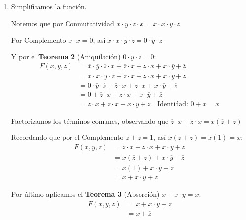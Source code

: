 \documentclass[12pt,letterpaper]{article}
\begin{document}
\begin{enumerate}[label=\arabic*.]
  \begin{enumerate}[label=\arabic*)]
  \item Simplificamos la funci\'{o}n.

    Notemos que por Conmutatividad $\overline{x} \cdot \overline{y} \cdot \overline{z} \cdot x = \overline{x} \cdot x \cdot \overline{y} \cdot \overline{z}$
    
    Por Complemento $\overline{x} \cdot x = 0$, as\'{i} $\overline{x} \cdot x \cdot \overline{y} \cdot \overline{z} = 0 \cdot \overline{y} \cdot \overline{z}$
    
    Y por el \textbf{Teorema 2} (Aniquilaci\'{o}n) $0 \cdot \overline{y} \cdot \overline{z} = 0$:
    \begin{align*}
      F(x, y, z) &= \overline{x} \cdot \overline{y} \cdot \overline{z} \cdot x + \overline{z} \cdot x + z \cdot x + x \cdot \overline{y} + \overline{z}\\
      &= \overline{x} \cdot x \cdot \overline{y} \cdot \overline{z} + \overline{z} \cdot x + z \cdot x + x \cdot \overline{y} + \overline{z}\\
      &= 0 \cdot \overline{y} \cdot \overline{z} + \overline{z} \cdot x + z \cdot x + x \cdot \overline{y} + \overline{z}\\
      &= 0 + \overline{z} \cdot x + z \cdot x + x \cdot \overline{y} + \overline{z}\\
      &= \overline{z} \cdot x + z \cdot x + x \cdot \overline{y} + \overline{z} \quad \text{Identidad: } 0 + x = x
    \end{align*}

    Factorizamos los términos comunes, observando que $\overline{z} \cdot x + z \cdot x = x(\overline{z} + z)$

    Recordando que por el Complemento $\overline{z} + z = 1$, as\'{i} $x(\overline{z} + z) = x(1) = x$:
    \begin{align*}
      F(x, y, z) &= \overline{z} \cdot x + z \cdot x + x \cdot \overline{y} + \overline{z}\\
      &= x(\overline{z} + z) + x \cdot \overline{y} + \overline{z}\\
      &= x(1) + x \cdot \overline{y} + \overline{z}\\
      &= x + x \cdot \overline{y} + \overline{z}
    \end{align*}

    Por \'{u}ltimo aplicamos el \textbf{Teorema 3} (Absorci\'{o}n) $x + x \cdot y = x$:
    \begin{align*}
      F(x, y, z) &=  x + x \cdot \overline{y} + \overline{z}\\
      &= x + \overline{z}
    \end{align*}


\end{enumerate}
\end{enumerate}
\end{document}
